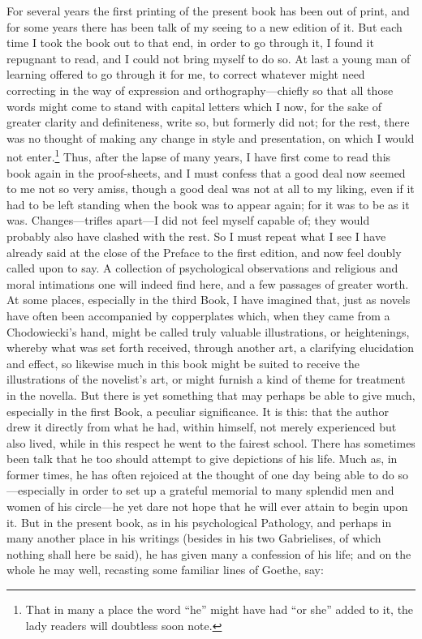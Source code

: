 \documentclass[12pt,a4paper]{book}
\begin{document}
For several years the first printing of the present book has been out of
print, and for some years there has been talk of my seeing to a new
edition of it. But each time I took the book out to that end, in order to
go through it, I found it repugnant to read, and I could not bring myself
to do so. At last a young man of learning offered to go through it for
me, to correct whatever might need correcting in the way of expression
and orthography---chiefly so that all those words might come to stand
with capital letters which I now, for the sake of greater clarity and
definiteness, write so, but formerly did not; for the rest, there was no
thought of making any change in style and presentation, on which I would
not enter.\footnote{That in many a place the word ``he'' might have had
``or she'' added to it, the lady readers will doubtless soon note.} Thus,
after the lapse of many years, I have first come to read this book again
in the proof-sheets, and I must confess that a good deal now seemed to me
not so very amiss, though a good deal was not at all to my liking, even
if it had to be left standing when the book was to appear again; for it
was to be as it was. Changes---trifles apart---I did not feel myself
capable of; they would probably also have clashed with the rest. So I
must repeat what I see I have already said at the close of the Preface to
the first edition, and now feel doubly called upon to say. A collection
of psychological observations and religious and moral intimations one
will indeed find here, and a few passages of greater worth. At some
places, especially in the third Book, I have imagined that, just as
novels have often been accompanied by copperplates which, when they came
from a Chodowiecki's hand, might be called truly valuable illustrations,
or heightenings, whereby what was set forth received, through another
art, a clarifying elucidation and effect, so likewise much in this book
might be suited to receive the illustrations of the novelist's art, or
might furnish a kind of theme for treatment in the novella. But there is
yet something that may perhaps be able to give much, especially in the
first Book, a peculiar significance. It is this: that the author drew it
directly from what he had, within himself, not merely experienced but
also lived, while in this respect he went to the fairest school. There
has sometimes been talk that he too should attempt to give depictions of
his life. Much as, in former times, he has often rejoiced at the thought
of one day being able to do so---especially in order to set up a grateful
memorial to many splendid men and women of his circle---he yet dare not
hope that he will ever attain to begin upon it. But in the present book,
as in his psychological Pathology, and perhaps in many another place in
his writings (besides in his two Gabrielises, of which nothing shall here
be said), he has given many a confession of his life; and on the whole he
may well, recasting some familiar lines of Goethe, say:
\end{document}
